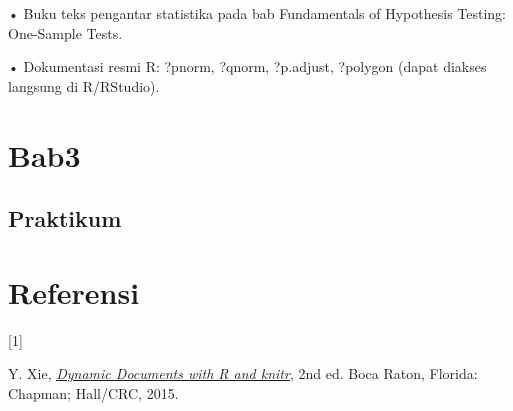 \documentclass[
  indonesian,
  letterpaper,
]{book}
\newlength{\cslhangindent}
\newlength{\csllabelwidth}
\newenvironment{CSLReferences}[2] %
 {\begin{list}{}{%
  \setlength{\itemindent}{0pt}
  \setlength{\leftmargin}{0pt}
  \setlength{\parsep}{0pt}
  \ifodd #1
   \setlength{\leftmargin}{\cslhangindent}
   \setlength{\itemindent}{-1\cslhangindent}
  \fi
  \setlength{\itemsep}{#2\baselineskip}}}
 {\end{list}}
\newcommand{\CSLLeftMargin}[1]{\parbox[t]{\csllabelwidth}{\strut#1\strut}}
\newcommand{\CSLRightInline}[1]{\parbox[t]{\linewidth - \csllabelwidth}{\strut#1\strut}}
\begin{document}
• Buku teks pengantar statistika pada bab Fundamentals of Hypothesis
Testing: One-Sample Tests.

• Dokumentasi resmi R: ?pnorm, ?qnorm, ?p.adjust, ?polygon (dapat
diakses langsung di R/RStudio).


\chapter{Bab3}\label{bab3}

\section{Praktikum}\label{praktikum}


\chapter*{Referensi}\label{referensi}


\protect{}\label{refs}
\begin{CSLReferences}{0}{0}
\CSLLeftMargin{{[}1{]} }%
\CSLRightInline{Y. Xie, \emph{\href{http://yihui.name/knitr/}{Dynamic
Documents with {R} and knitr}}, 2nd ed. Boca Raton, Florida: Chapman;
Hall/CRC, 2015.}

\end{CSLReferences}


\backmatter
\end{document}
